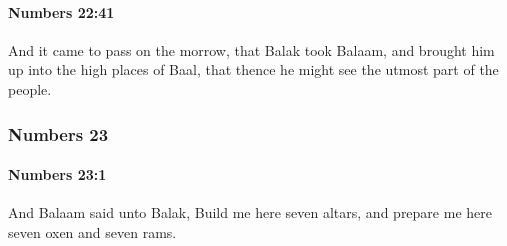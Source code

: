 		\paragraph{Numbers 22:41} %
			\label{NUMBERS-22-41}

			And it came to pass on the morrow, that Balak took Balaam, and brought him up into the high places of Baal, that thence he might see the utmost part of the people.

	\subsubsection{Numbers 23} %
		\label{NUMBERS-23}

		\paragraph{Numbers 23:1} %
			\label{NUMBERS-23-1}

			And Balaam said unto Balak, Build me here seven altars, and prepare me here seven oxen and seven rams.

